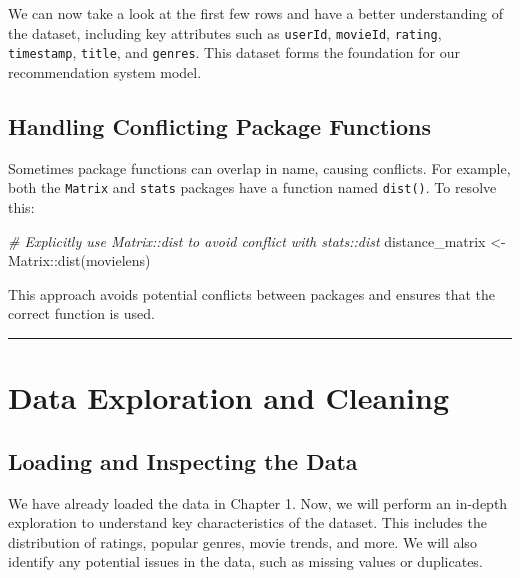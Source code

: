 \documentclass[
]{article}
\newenvironment{Shaded}{}{}
\newcommand{\CommentTok}[1]{\textcolor[rgb]{0.38,0.63,0.69}{\textit{#1}}}
\newcommand{\FunctionTok}[1]{\textcolor[rgb]{0.02,0.16,0.49}{#1}}
\newcommand{\NormalTok}[1]{#1}
\newcommand{\OtherTok}[1]{\textcolor[rgb]{0.00,0.44,0.13}{#1}}
\newcommand{\SpecialCharTok}[1]{\textcolor[rgb]{0.25,0.44,0.63}{#1}}
\begin{document}
We can now take a look at the first few rows and have a better
understanding of the dataset, including key attributes such as
\texttt{userId}, \texttt{movieId}, \texttt{rating}, \texttt{timestamp},
\texttt{title}, and \texttt{genres}. This dataset forms the foundation
for our recommendation system model.

\subsection{Handling Conflicting Package
Functions}\label{handling-conflicting-package-functions}

Sometimes package functions can overlap in name, causing conflicts. For
example, both the \texttt{Matrix} and \texttt{stats} packages have a
function named \texttt{dist()}. To resolve this:

\begin{Shaded}
\begin{Highlighting}[]
\CommentTok{\# Explicitly use Matrix::dist to avoid conflict with stats::dist}
\NormalTok{distance\_matrix }\OtherTok{\textless{}{-}}\NormalTok{ Matrix}\SpecialCharTok{::}\FunctionTok{dist}\NormalTok{(movielens)}
\end{Highlighting}
\end{Shaded}

This approach avoids potential conflicts between packages and ensures
that the correct function is used.

\begin{center}\rule{0.5\linewidth}{0.5pt}\end{center}

\section{Data Exploration and
Cleaning}\label{data-exploration-and-cleaning}

\subsection{Loading and Inspecting the
Data}\label{loading-and-inspecting-the-data}

We have already loaded the data in Chapter 1. Now, we will perform an
in-depth exploration to understand key characteristics of the dataset.
This includes the distribution of ratings, popular genres, movie trends,
and more. We will also identify any potential issues in the data, such
as missing values or duplicates.
\end{document}
